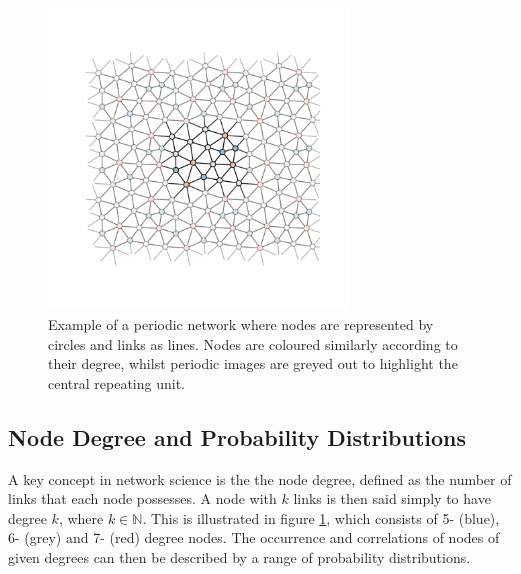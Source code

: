 \begin{figure}[h]
     \centering
      \includegraphics[width=8cm]{./figures/methods/small_periodic_net.pdf}
     \caption{Example of a periodic \td{} network where nodes are represented by circles and links as lines. Nodes are coloured similarly according to their degree, whilst periodic images are greyed out to highlight the central repeating unit.}
     \label{fig:smallnet}
\end{figure}

\subsection{Node Degree and Probability Distributions} 

A key concept in network science is the the node degree, defined as the number of links that each node possesses.
A node with $k$ links is then said simply to have degree $k$, where $k\in\mathbb{N}$.
This is illustrated in figure \ref{fig:smallnet}, which consists of 5\-- (blue), 6\-- (grey) and 7\-- (red) degree nodes.
The occurrence and correlations of nodes of given degrees can then be described by a range of probability distributions.

